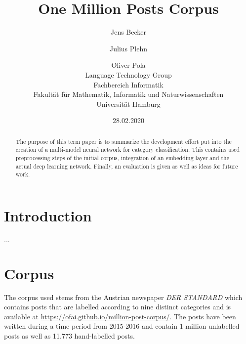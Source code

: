 \documentclass[11pt,a4paper]{article}
\title{One Million Posts Corpus}
\author{Jens Becker \and Julius Plehn \and Oliver Pola \\ 
	Language Technology Group \\
	Fachbereich Informatik \\
	Fakultät für Mathematik, Informatik und Naturwissenschaften \\
	Universität Hamburg
}
\date{28.02.2020}
\begin{document}
\maketitle
\begin{abstract}
The purpose of this term paper is to summarize the development effort put into the creation of a multi-model neural network for category classification. This contains used preprocessing steps of the initial corpus, integration of an embedding layer and the actual deep learning network. Finally, an evaluation is given as well as ideas for future work. 

 
\end{abstract}

\section{Introduction}

...~\cite{Schabus17, Schabus18}


\section{Corpus}
The corpus used stems from the Austrian newspaper \textit{DER STANDARD} which contains posts that are labelled according to nine distinct categories and is available at \url{https://ofai.github.io/million-post-corpus/}. The posts have been written during a time period from 2015-2016 and contain 1 million unlabelled posts as well as 11.773 hand-labelled posts.
\end{document}
